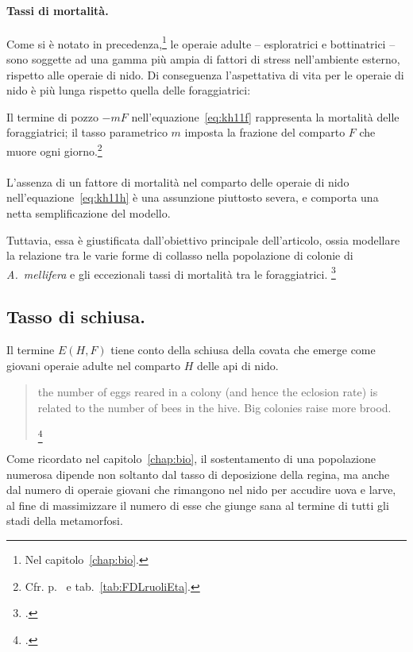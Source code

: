 \paragraph{Tassi di mortalità.}
Come si è notato in precedenza,\footnote{Nel capitolo~\ref{chap:bio}.}
le operaie adulte -- esploratrici e bottinatrici -- sono soggette ad una gamma più ampia di fattori di stress
nell'ambiente esterno, rispetto alle operaie di nido. Di conseguenza l'aspettativa di vita per le operaie di
nido è più lunga rispetto quella delle foraggiatrici:

Il termine di pozzo $-mF$ nell'equazione~\eqref{eq:kh11f} rappresenta la mortalità delle foraggiatrici;
il tasso parametrico $m$ imposta la frazione del comparto $F$ che muore ogni giorno.\footnote{Cfr. %
p.~\pageref{par:mInverseFlightspan} e tab.~\ref{tab:FDLruoliEta}.}


\paragraph{}
L'assenza di un fattore di mortalità nel comparto delle operaie di nido nell'equazione~\eqref{eq:kh11h} è
una assunzione piuttosto severa, e comporta una netta semplificazione del modello.

Tuttavia, essa è giustificata dall'obiettivo principale dell'articolo, ossia modellare la relazione tra le varie
forme di collasso nella popolazione di colonie di \emph{A.~mellifera} e gli eccezionali tassi di mortalità
tra le foraggiatrici.
\footcite[1,2,3,5]{khoury2011}

\subsection{Tasso di schiusa.}
Il termine $E(H,F)$ tiene conto della schiusa della covata che emerge come giovani operaie adulte nel
comparto $H$ delle api di nido.
\blockquote[{\footcite[2]{khoury2011}}]{\omissis the number of eggs reared in a colony (and hence the eclosion rate) is related to the number of bees in the hive. Big colonies raise more brood.}

Come ricordato nel capitolo~\ref{chap:bio}, il sostentamento di una popolazione numerosa dipende non soltanto
dal tasso di deposizione della regina, ma anche dal numero di operaie giovani che rimangono nel nido per
accudire uova e larve, al fine di massimizzare il numero di esse che giunge sana al termine di tutti gli stadi
della metamorfosi.


